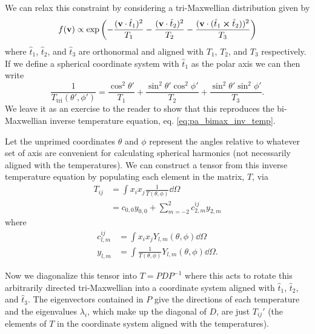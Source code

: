 We can relax this constraint by considering a tri-Maxwellian distribution given by
\begin{equation}
    f(\vb{v}) \propto \exp\left(-\frac{(\vb{v}\cdot\hat{t}_1)^2}{T_1} -\frac{(\vb{v}\cdot\hat{t}_2)^2}{T_2} -\frac{(\vb{v}\cdot(\hat{t}_1 \cross \hat{t}_2))^2}{T_3}\right)
\end{equation}
where $\hat{t}_1$, $\hat{t}_2$, and $\hat{t}_3$ are orthonormal and aligned with $T_1$, $T_2$, and $T_3$ respectively. If we define a spherical coordinate system with $\hat{t}_1$ as the polar axis we can then write
\begin{equation}
    \frac{1}{T_\text{tri}(\theta', \phi')} = \frac{\cos^2\theta'}{T_1} + \frac{\sin^2\theta'\cos^2\phi'}{T_2} + \frac{\sin^2\theta'\sin^2\phi'}{T_3}.
    \label{eq:pa_trimax_inv_temp}
\end{equation}
We leave it as an exercise to the reader to show that this reproduces the bi-Maxwellian inverse temperature equation, eq. \ref{eq:pa_bimax_inv_temp}.

Let the unprimed coordinates $\theta$ and $\phi$ represent the angles relative to whatever set of axis are convenient for calculating spherical harmonics (not necessarily aligned with the temperatures). We can construct a tensor from this inverse temperature equation by populating each element in the matrix, $T$, via
\begin{align*}
    T_{ij} &= \int x_i x_j \frac{1}{T(\theta, \phi)} \dd \Omega \\
    &= c_{0,0} y_{0,0} + \sum_{m=-2}^2 c_{2,m}^{ij} y_{2,m}
\end{align*}
where
\begin{align*}
    c_{l,m}^{ij} &= \int x_i x_j Y_{l,m}(\theta, \phi) \dd \Omega \\
    y_{l,m} &= \int \frac{1}{T(\theta, \phi)} Y_{l,m}(\theta, \phi) \dd \Omega.
\end{align*}

Now we diagonalize this tensor into $T = P D P^{-1}$ where this acts to rotate this arbitrarily directed tri-Maxwellian into a coordinate system aligned with $\hat{t}_1$, $\hat{t}_2$, and $\hat{t}_3$. The eigenvectors contained in $P$ give the directions of each temperature and the eigenvalues $\lambda_i$, which make up the diagonal of $D$, are just $T_{ij}'$ (the elements of $T$ in the coordinate system aligned with the temperatures).

